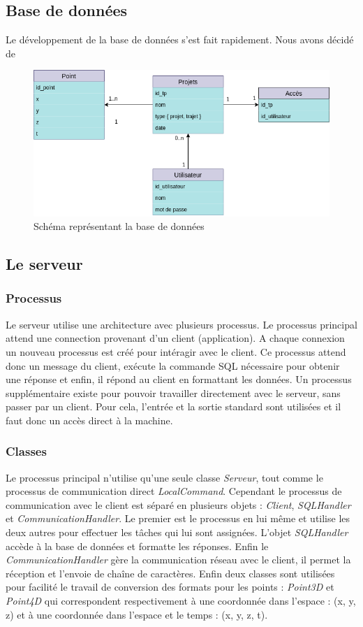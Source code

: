\subsection{Base de données}
Le développement de la base de données s'est fait rapidement. Nous avons décidé de 
\begin{figure}[ht]
    \label{Schéma de la base de données}
    \centering
    \includegraphics[scale=0.6]{images/bdd.png}
    \caption{Schéma représentant la base de données}
\end{figure}

\subsection{Le serveur}
\subsubsection{Processus}
Le serveur utilise une architecture avec plusieurs processus. Le processus principal attend une connection provenant d'un client (application).
A chaque connexion un nouveau processus est créé pour intéragir avec le client. Ce processus attend donc un message du client, exécute la commande
SQL nécessaire pour obtenir une réponse et enfin, il répond au client en formattant les données. Un processus supplémentaire existe pour pouvoir
travailler directement avec le serveur, sans passer par un client. Pour cela, l'entrée et la sortie standard sont utilisées et il faut donc un accès direct à la machine.
\subsubsection{Classes}
Le processus principal n'utilise qu'une seule classe \emph{Serveur}, tout comme le processus de communication direct \emph{LocalCommand}.
Cependant le processus de communication avec le client est séparé en plusieurs objets : \emph{Client}, \emph{SQLHandler} et \emph{CommunicationHandler}. 
Le premier est le processus en lui même et utilise les deux autres pour effectuer les tâches qui lui sont assignées. L'objet \emph{SQLHandler} accède à la base de données et formatte les réponses.
Enfin le \emph{CommunicationHandler} gère la communication réseau avec le client, il permet la réception et l'envoie de chaîne de caractères.
Enfin deux classes sont utilisées pour facilité le travail de conversion des formats pour les points : \emph{Point3D} et \emph{Point4D} qui correspondent respectivement à une coordonnée dans l'espace : (x, y, z)
et à une coordonnée dans l'espace et le temps : (x, y, z, t).
